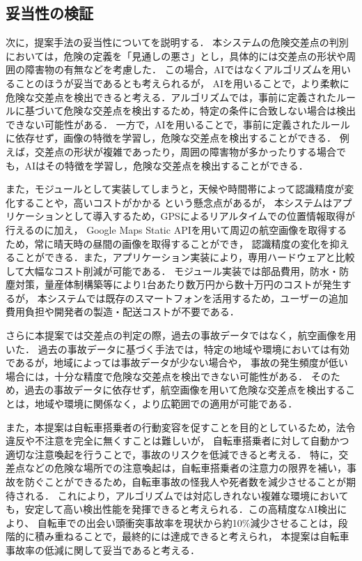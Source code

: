 \documentclass[uplatex,dvipdfmx]{jsarticle}
\begin{document}
\subsection{妥当性の検証}
\indent
次に，提案手法の妥当性についてを説明する．
本システムの危険交差点の判別においては，危険の定義を「見通しの悪さ」とし，具体的には交差点の形状や周囲の障害物の有無などを考慮した．
この場合，AIではなくアルゴリズムを用いることのほうが妥当であるとも考えられるが，
AIを用いることで，より柔軟に危険な交差点を検出できると考える．アルゴリズムでは，事前に定義されたルールに基づいて危険な交差点を検出するため，特定の条件に合致しない場合は検出できない可能性がある．
一方で，AIを用いることで，事前に定義されたルールに依存せず，画像の特徴を学習し，危険な交差点を検出することができる．
例えば，交差点の形状が複雑であったり，周囲の障害物が多かったりする場合でも，AIはその特徴を学習し，危険な交差点を検出することができる．
\par
また，モジュールとして実装してしまうと，天候や時間帯によって認識精度が変化することや，高いコストがかかる
という懸念点があるが，
本システムはアプリケーションとして導入するため，GPSによるリアルタイムでの位置情報取得が行えるのに加え，
Google Maps Static APIを用いて周辺の航空画像を取得するため，常に晴天時の昼間の画像を取得することができ，
認識精度の変化を抑えることができる．また，アプリケーション実装により，専用ハードウェアと比較して大幅なコスト削減が可能である．
モジュール実装では部品費用，防水・防塵対策，量産体制構築等により1台あたり数万円から数十万円のコストが発生するが，
本システムでは既存のスマートフォンを活用するため，ユーザーの追加費用負担や開発者の製造・配送コストが不要である．
\par
さらに本提案では交差点の判定の際，過去の事故データではなく，航空画像を用いた．
過去の事故データに基づく手法では，特定の地域や環境においては有効であるが，地域によっては事故データが少ない場合や，
事故の発生頻度が低い場合には，十分な精度で危険な交差点を検出できない可能性がある．
そのため，過去の事故データに依存せず，航空画像を用いて危険な交差点を検出することは，地域や環境に関係なく，より広範囲での適用が可能である．
\par
また，本提案は自転車搭乗者の行動変容を促すことを目的としているため，法令違反や不注意を完全に無くすことは難しいが，
自転車搭乗者に対して自動かつ適切な注意喚起を行うことで，事故のリスクを低減できると考える．
特に，交差点などの危険な場所での注意喚起は，自転車搭乗者の注意力の限界を補い，事故を防ぐことができるため，自転車事故の怪我人や死者数を減少させることが期待される．
これにより，アルゴリズムでは対応しきれない複雑な環境においても，安定して高い検出性能を発揮できると考えられる．この高精度なAI検出により、
自転車での出会い頭衝突事故率を現状から約10\%減少させることは，段階的に積み重ねることで，最終的には達成できると考えられ，
本提案は自転車事故率の低減に関して妥当であると考える．
\par
\end{document}
